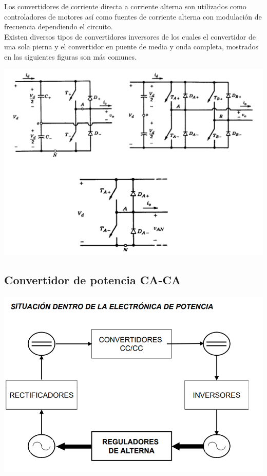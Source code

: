 \documentclass[12pt,a4paper]{article}
\begin{document}
Los convertidores de corriente directa a corriente alterna son utilizados como controladores de motores así como fuentes de corriente alterna con modulación de frecuencia dependiendo el circuito. \\
Existen diversos tipos de convertidores inversores de los cuales el convertidor de una sola pierna y el convertidor en puente de media y onda completa, mostrados en las siguientes figuras son más comunes.\\
\linebreak
\linebreak
\begin{center}
\includegraphics[scale=0.9]{imagenes/CD_CA.PNG} 
\end{center}
\newpage
\begin{flushleft}
\section{Convertidor de potencia CA-CA}
\includegraphics[scale=0.8]{imagenes/CA_CA.PNG} 
\end{flushleft}
\end{document}

